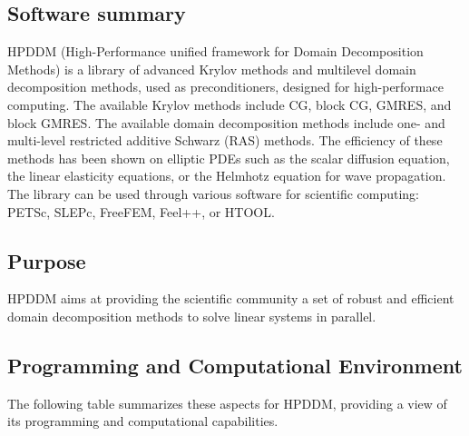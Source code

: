 \subsection{Software summary}
\label{sec:HPDDM:summary}

HPDDM (High-Performance unified framework for Domain Decomposition Methods) is a library of
advanced Krylov methods and multilevel domain decomposition methods, used as preconditioners, designed for high-performace computing.
The available Krylov methods include CG, block CG, GMRES, and block GMRES.
The available domain decomposition methods include one- and multi-level restricted additive Schwarz (RAS) methods.
The efficiency of these methods has been shown on elliptic PDEs such as the scalar diffusion equation, the linear elasticity equations,
or the Helmhotz equation for wave propagation.
The library can be used through various software for scientific computing:
PETSc, SLEPc, FreeFEM, Feel++, or HTOOL.

\subsection{Purpose}
\label{sec:HPDDM:purpose}

HPDDM aims at providing the scientific community a set of robust and efficient domain decomposition methods
to solve linear systems in parallel.

\subsection{Programming and Computational Environment}
\label{sec::HPDDM:environment_capabilities}


The following table summarizes these aspects for HPDDM, providing a  view of its programming and computational capabilities.

